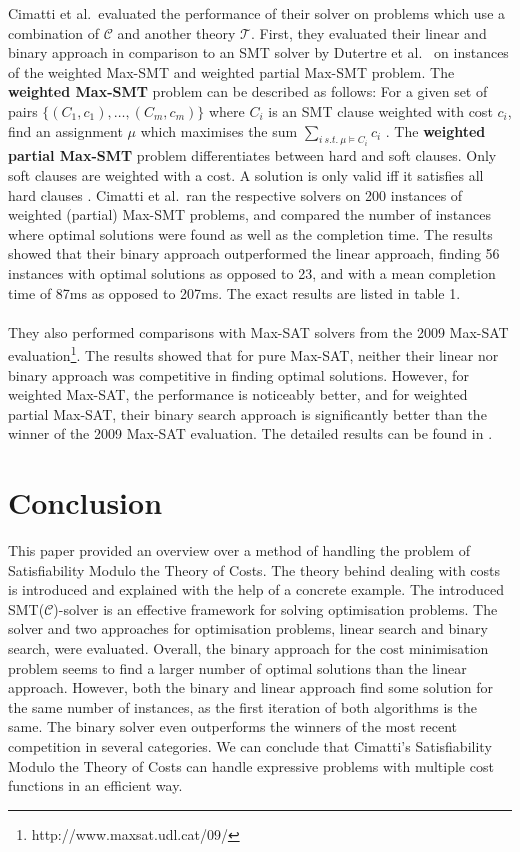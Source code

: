 \documentclass{amsart}
\theoremstyle{definition}
\theoremstyle{remark}
\numberwithin{equation}{section}
\def\T{$\mathcal{T}$}
\def\C{$\mathcal{C}$}
\begin{document}
    Cimatti et al.\ evaluated the performance of their solver on problems which use a combination of \C{} and another theory \T{}. First, they evaluated their linear and binary approach in comparison to an SMT solver by Dutertre et al.\ \cite{yices06} on instances of the weighted Max-SMT and weighted partial Max-SMT problem. The \textbf{weighted Max-SMT} problem can be described as follows: For a given set of pairs $\{\left(C_1, c_1\right), \ldots, \left(C_m, c_m\right)\}$ where $C_i$ is an SMT clause weighted with cost $c_i$, find an assignment $\mu$ which maximises the sum $\sum_{i\ s.t.\ \mu \models C_i} c_i$ \cite{Nieuwenhuis06}. The \textbf{weighted partial Max-SMT} problem differentiates between hard and soft clauses. Only soft clauses are weighted with a cost. A solution is only valid iff it satisfies all hard clauses \cite{Robinson10}. Cimatti et al.\ ran the respective solvers on 200 instances of weighted (partial) Max-SMT problems, and compared the number of instances where optimal solutions were found as well as the completion time. The results showed that their binary approach outperformed the linear approach, finding 56 instances with optimal solutions as opposed to 23, and with a mean completion time of 87ms as opposed to 207ms. The exact results are listed in table 1.
    \\\\
    They also performed comparisons with Max-SAT solvers from the 2009 Max-SAT evaluation\footnote{http://www.maxsat.udl.cat/09/}. The results showed that for pure Max-SAT, neither their linear nor binary approach was competitive in finding optimal solutions. However, for weighted Max-SAT, the performance is noticeably better, and for weighted partial Max-SAT, their binary search approach is significantly better than the winner of the 2009 Max-SAT evaluation. The detailed results can be found in \cite{Cimatti10}. 

  \section{Conclusion}
    \label{conclusion}
    This paper provided an overview over a method of handling the problem of Satisfiability Modulo the Theory of Costs. The theory behind dealing with costs is introduced and explained with the help of a concrete example.
    The introduced SMT(\C{})-solver is an effective framework for solving optimisation problems.
    The solver and two approaches for optimisation problems, linear search and binary search, were evaluated. 
    Overall, the binary approach for the cost minimisation problem seems to find a larger number of optimal solutions than the linear approach.
    However, both the binary and linear approach find some solution for the same number of instances, as the first iteration of both algorithms is the same.
    The binary solver even outperforms the winners of the most recent competition in several categories. We can conclude that Cimatti's Satisfiability Modulo the Theory of Costs can handle expressive problems with multiple cost functions in an efficient way.



    
   
  
  
\end{document}
